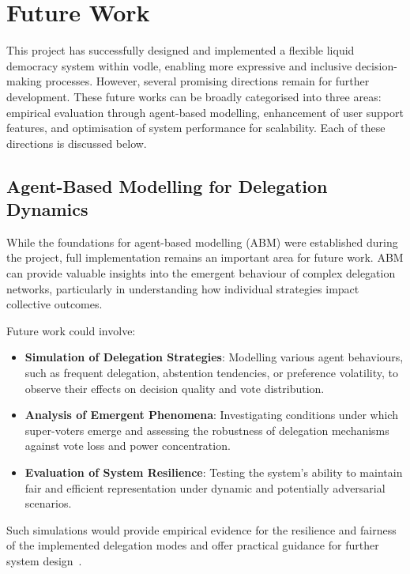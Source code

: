 \chapter{Future Work}

This project has successfully designed and implemented a flexible liquid democracy system within vodle, enabling more expressive and inclusive decision-making processes. However, several promising directions remain for further development. These future works can be broadly categorised into three areas: empirical evaluation through agent-based modelling, enhancement of user support features, and optimisation of system performance for scalability. Each of these directions is discussed below.

\section{Agent-Based Modelling for Delegation Dynamics}

While the foundations for agent-based modelling (ABM) were established during the project, full implementation remains an important area for future work. ABM can provide valuable insights into the emergent behaviour of complex delegation networks, particularly in understanding how individual strategies impact collective outcomes.

Future work could involve:

\begin{itemize}
    \item \textbf{Simulation of Delegation Strategies}: Modelling various agent behaviours, such as frequent delegation, abstention tendencies, or preference volatility, to observe their effects on decision quality and vote distribution.
    \item \textbf{Analysis of Emergent Phenomena}: Investigating conditions under which super-voters emerge and assessing the robustness of delegation mechanisms against vote loss and power concentration.
    \item \textbf{Evaluation of System Resilience}: Testing the system's ability to maintain fair and efficient representation under dynamic and potentially adversarial scenarios.
\end{itemize}

Such simulations would provide empirical evidence for the resilience and fairness of the implemented delegation modes and offer practical guidance for further system design~\cite{goel2016diffusion, brilliquid}.

